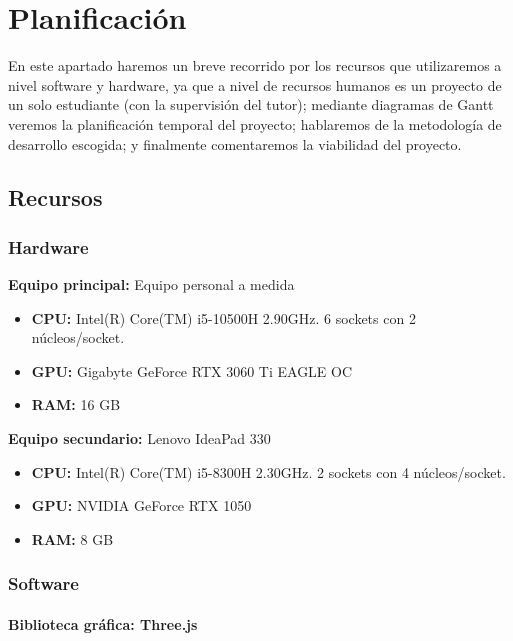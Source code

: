 \section{Planificación}

En este apartado haremos un breve recorrido por los recursos que utilizaremos a nivel software y hardware, ya que a nivel de recursos humanos es un proyecto de un solo estudiante (con la supervisión del tutor); mediante diagramas de Gantt veremos la planificación temporal del proyecto; hablaremos de la metodología de desarrollo escogida; y finalmente comentaremos la viabilidad del proyecto.


\subsection{Recursos}

\subsubsection{Hardware}
    
    \textbf{Equipo principal:} Equipo personal a medida
    \begin{itemize}
        \item \textbf{CPU:} Intel(R) Core(TM) i5-10500H 2.90GHz. 6 sockets con 2 núcleos/socket.
        \item \textbf{GPU:} Gigabyte GeForce RTX 3060 Ti EAGLE OC
        \item \textbf{RAM:} 16 GB
    \end{itemize}
    
    \textbf{Equipo secundario:} Lenovo IdeaPad 330
    \begin{itemize}
        \item \textbf{CPU:} Intel(R) Core(TM) i5-8300H 2.30GHz. 2 sockets con 4 núcleos/socket.
        \item \textbf{GPU:} NVIDIA GeForce RTX 1050
        \item \textbf{RAM:} 8 GB
    \end{itemize}

\subsubsection{Software}

\paragraph{Biblioteca gráfica: Three.js}

